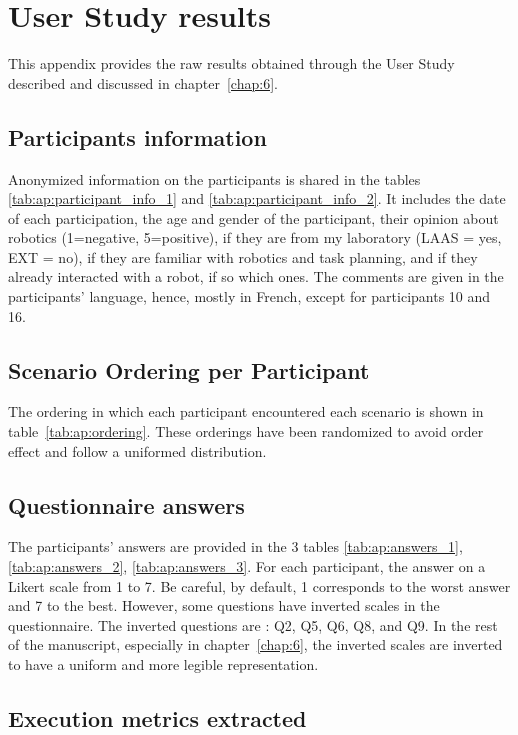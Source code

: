 \chapter{User Study results}
\label{ap:study}

This appendix provides the raw results obtained through the User Study described and discussed in chapter~\ref{chap:6}.

\section{Participants information}

Anonymized information on the participants is shared in the tables \ref{tab:ap:participant_info_1} and \ref{tab:ap:participant_info_2}. It includes the date of each participation, the age and gender of the participant, their opinion about robotics (1=negative, 5=positive), if they are from my laboratory (LAAS = yes, EXT = no), if they are familiar with robotics and task planning, and if they already interacted with a robot, if so which ones. The comments are given in the participants' language, hence, mostly in French, except for participants 10 and 16. 

\section{Scenario Ordering per Participant}

The ordering in which each participant encountered each scenario is shown in table~\ref{tab:ap:ordering}. These orderings have been randomized to avoid order effect and follow a uniformed distribution.

\section{Questionnaire answers}

The participants' answers are provided in the 3 tables \ref{tab:ap:answers_1}, \ref{tab:ap:answers_2}, \ref{tab:ap:answers_3}. For each participant, the answer on a
Likert scale from 1 to 7. Be careful, by default, 1 corresponds to the worst answer and 7 to the best. However, some questions have inverted scales in the questionnaire. The inverted questions are : Q2, Q5, Q6, Q8, and Q9. In the rest of the manuscript, especially in chapter~\ref{chap:6}, the inverted scales are inverted to have a uniform and more legible representation. 

\section{Execution metrics extracted}

